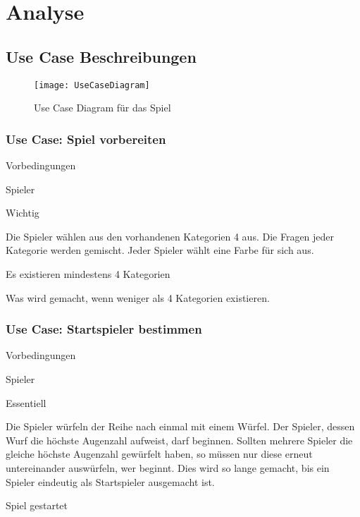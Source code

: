 \chapter{Analyse}\label{chap:Analyse}

\section{Use Case Beschreibungen}
\begin{figure}[h]
  \begin{center}
    \texttt{[image: UseCaseDiagram]}
    \caption{Use Case Diagram für das Spiel}
  \end{center}
\end{figure}

\subsection{Use Case: Spiel vorbereiten}
\begin{labeling}[:]{Vorbedingungen}
\item [Akteure] Spieler
\item [Priorität] Wichtig
\item [Beschreibung] Die Spieler wählen aus den vorhandenen Kategorien 4 aus. Die Fragen jeder Kategorie werden gemischt. Jeder Spieler wählt eine Farbe für sich aus.
\item [Vorbedingungen] Es existieren mindestens 4 Kategorien
\item [Offene Punkte] Was wird gemacht, wenn weniger als 4 Kategorien existieren.
\end{labeling}

\subsection{Use Case: Startspieler bestimmen}
\begin{labeling}[:]{Vorbedingungen}
\item [Akteure] Spieler
\item [Priorität] Essentiell
\item [Beschreibung] Die Spieler würfeln der Reihe nach einmal mit einem Würfel. Der Spieler, dessen Wurf die höchste Augenzahl aufweist, darf beginnen. Sollten mehrere Spieler die gleiche höchste Augenzahl gewürfelt haben, so müssen nur diese erneut untereinander auswürfeln, wer beginnt. Dies wird so lange gemacht, bis ein Spieler eindeutig als Startspieler ausgemacht ist.
\item [Vorbedingungen] Spiel gestartet
\item [Offene Punkte]
\end{labeling}

